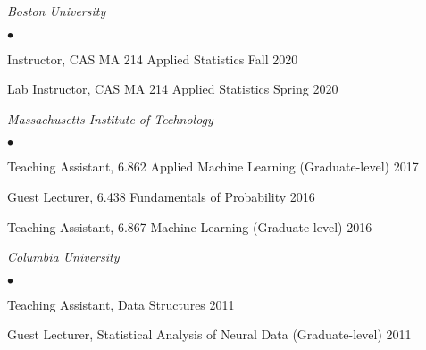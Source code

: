 \documentclass[margin,line]{res}
\newenvironment{list2}{
  \begin{list}{$\bullet$}{%
      \setlength{\itemsep}{0in}
      \setlength{\parsep}{0in} \setlength{\parskip}{0in}
      \setlength{\topsep}{0in} \setlength{\partopsep}{0in}
      \setlength{\leftmargin}{0.2in}}}{\end{list}}
\begin{document}
\begin{resume}
\emph{Boston University}
\begin{list2}
\item Instructor, CAS MA 214 Applied Statistics \hfill Fall 2020
\item Lab Instructor, CAS MA 214 Applied Statistics \hfill Spring 2020
\end{list2}

\emph{Massachusetts Institute of Technology}
\begin{list2}
\item Teaching Assistant, 6.862 Applied Machine Learning (Graduate-level) \hfill 2017
\item Guest Lecturer, 6.438 Fundamentals of Probability \hfill 2016
\item Teaching Assistant, 6.867 Machine Learning (Graduate-level) \hfill 2016
\end{list2}

\emph{Columbia University}
\begin{list2}
\item Teaching Assistant, Data Structures \hfill 2011
\item Guest Lecturer, Statistical Analysis of Neural Data (Graduate-level) \hfill  2011
\end{list2}






\end{resume}
\end{document}
